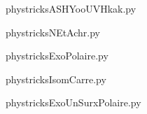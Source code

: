     

    \clearpage
    


    \newcommand{\CaptionFigASHYooUVHkak}{<+Type your caption here+>}
    \begin{center}
        
    \end{center}
    phystricksASHYooUVHkak.py

    

    \clearpage
    


    \newcommand{\CaptionFigNEtAchr}{<+Type your caption here+>}
    \begin{center}
        
    \end{center}
    phystricksNEtAchr.py

    

    \clearpage
    


    \newcommand{\CaptionFigExoPolaire}{<+Type your caption here+>}
    \begin{center}
        
    \end{center}
    phystricksExoPolaire.py

    

    \clearpage
    


    \newcommand{\CaptionFigIsomCarre}{<+Type your caption here+>}
    \begin{center}
        
    \end{center}
    phystricksIsomCarre.py

    

    \clearpage
    


    \newcommand{\CaptionFigExoUnSurxPolaire}{<+Type your caption here+>}
    \begin{center}
        
    \end{center}
    phystricksExoUnSurxPolaire.py

    

    \clearpage
    


